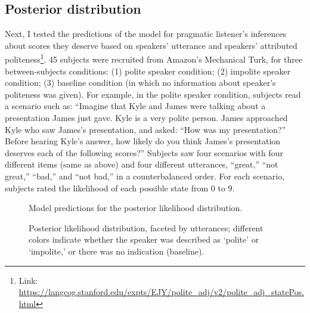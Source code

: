 \documentclass[10pt,letterpaper]{article}
\begin{document}
\subsection{Posterior distribution}

Next, I tested the predictions of the model for pragmatic listener's inferences about scores they deserve based on speakers' utterance and speakers' attributed politeness\footnote{Link: \url{https://langcog.stanford.edu/expts/EJY/polite\_adj/v2/polite\_adj\_statePos.html}}. 45 subjects were recruited from Amazon's Mechanical Turk, for three between-subjects conditions: (1) polite speaker condition; (2) impolite speaker condition; (3) baseline condition (in which no information about speaker's politeness was given). For example, in the polite speaker condition, subjects read a scenario such as: ``Imagine that Kyle and James were talking about a presentation James just gave. Kyle is a very polite person. James approached Kyle who saw James's presentation, and asked: ``How was my presentation?'' Before hearing Kyle's answer, how likely do you think James's presentation deserves each of the following scores?'' Subjects saw four scenarios with four different items (same as above) and four different utterances, ``great,'' ``not great,'' ``bad,'' and ``not bad,'' in a counterbalanced order. For each scenario, subjects rated the likelihood of each possible state from 0 to 9.


\begin{figure}[t]
	\caption{\label{fig:posteriormodel} Model predictions for the posterior likelihood distribution.}
\end{figure}

\begin{figure}[t]
	\caption{\label{fig:posterior} Posterior likelihood distribution, faceted by utterances; different colors indicate whether the speaker was described as `polite' or `impolite,' or there was no indication (baseline).}
\end{figure}
\end{document}
